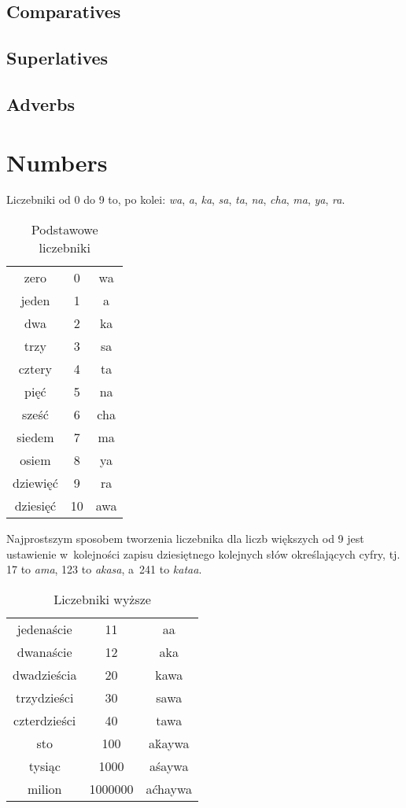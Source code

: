 \subsection{Comparatives}
\subsection{Superlatives}

\subsection{Adverbs}

\section{Numbers}

Liczebniki od 0 do 9 to, po kolei: \emph{wa}, \emph{a}, \emph{ka}, \emph{sa},
\emph{ta}, \emph{na}, \emph{cha}, \emph{ma}, \emph{ya}, \emph{ra}.

\begin{table}[ht]
  \centering
  \caption{Podstawowe liczebniki}
  \begin{tabular}{ccc} \toprule
    zero     & 0  & wa  \\
    jeden    & 1  & a   \\
    dwa      & 2  & ka  \\
    trzy     & 3  & sa  \\
    cztery   & 4  & ta  \\
    pięć     & 5  & na  \\
    sześć    & 6  & cha \\
    siedem   & 7  & ma  \\
    osiem    & 8  & ya  \\
    dziewięć & 9  & ra  \\
    dziesięć & 10 & awa \\\bottomrule
  \end{tabular}
  \label{tab:numerals}
\end{table}

Najprostszym sposobem tworzenia liczebnika dla liczb większych od 9 jest
ustawienie w~kolejności zapisu dziesiętnego kolejnych słów określających cyfry,
tj. 17 to \emph{ama}, 123 to \emph{akasa}, a~241 to \emph{kataa}.

\begin{table}[ht]
  \centering
  \caption{Liczebniki wyższe}
  \begin{tabular}{ccc} \toprule
    jedenaście   & 11      & aa      \\
    dwanaście    & 12      & aka     \\
    dwadzieścia  & 20      & kawa    \\
    trzydzieści  & 30      & sawa    \\
    czterdzieści & 40      & tawa    \\
    sto          & 100     & aḱaywa  \\
    tysiąc       & 1000    & aśaywa  \\
    milion       & 1000000 & aćhaywa \\\bottomrule
  \end{tabular}
  \label{tab:numerals2}
\end{table}

